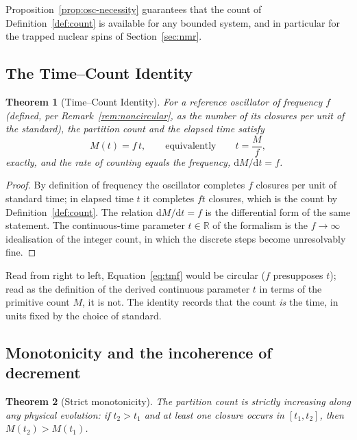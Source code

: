 \documentclass[11pt,a4paper]{article}
\theoremstyle{thmstyle}
\newtheorem{theorem}{Theorem}[section]
\theoremstyle{definition}
\theoremstyle{remark}
\newcommand{\R}{\mathbb{R}}
\newcommand{\Count}{M}
\begin{document}
Proposition~\ref{prop:osc-necessity} guarantees that the count of
Definition~\ref{def:count} is available for any bounded system, and in
particular for the trapped nuclear spins of Section~\ref{sec:nmr}.

\subsection{The Time--Count Identity}
\label{sec:time-count}

\begin{theorem}[Time--Count Identity]
\label{thm:time-count}
For a reference oscillator of frequency $f$ (defined, per
Remark~\ref{rem:noncircular}, as the number of its closures per unit of
the standard), the partition count and the elapsed time satisfy
\begin{equation}
\Count(t) = f\,t, \qquad\text{equivalently}\qquad t = \frac{\Count}{f},
\label{eq:tmf}
\end{equation}
exactly, and the rate of counting equals the frequency,
$\mathrm{d}\Count/\mathrm{d}t=f$.
\end{theorem}

\begin{proof}
By definition of frequency the oscillator completes $f$ closures per unit
of standard time; in elapsed time $t$ it completes $ft$ closures, which
is the count by Definition~\ref{def:count}. The relation
$\mathrm{d}\Count/\mathrm{d}t=f$ is the differential form of the same
statement. The continuous-time parameter $t\in\R$ of the formalism is the
$f\to\infty$ idealisation of the integer count, in which the discrete
steps become unresolvably fine.
\end{proof}

Read from right to left, Equation~\eqref{eq:tmf} would be circular
($f$ presupposes $t$); read as the definition of the derived continuous
parameter $t$ in terms of the primitive count $\Count$, it is not. The
identity records that the count \emph{is} the time, in units fixed by the
choice of standard.

\subsection{Monotonicity and the incoherence of decrement}
\label{sec:monotone}

\begin{theorem}[Strict monotonicity]
\label{thm:monotone}
The partition count is strictly increasing along any physical evolution:
if $t_{2}>t_{1}$ and at least one closure occurs in $[t_{1},t_{2}]$, then
$\Count(t_{2})>\Count(t_{1})$.
\end{theorem}
\end{document}
